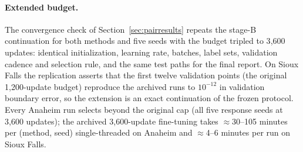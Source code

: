 \paragraph{Extended budget.}
The convergence check of Section~\ref{sec:pairresults} repeats the
stage-B continuation for both methods and five seeds with the budget
tripled to 3{,}600 updates: identical initialization, learning rate,
batches, label sets, validation cadence and selection rule, and the
same test paths for the final report. On Sioux Falls the replication
asserts that the first twelve validation points (the original
1{,}200-update budget) reproduce the archived runs to $10^{-12}$ in
validation boundary error, so the extension is an exact continuation
of the frozen protocol. Every Anaheim run selects beyond the original
cap (all five response seeds at 3{,}600 updates); the archived
3{,}600-update fine-tuning takes $\approx$30--105 minutes per
(method, seed) single-threaded on Anaheim and $\approx$4--6 minutes
per run on Sioux Falls.
